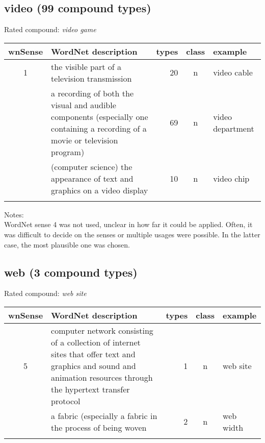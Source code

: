 \subsection{video       (99 compound types)}
Rated compound: \emph{video game}


\vspace*{1ex}

\noindent
\begin{longtable}{c>{\raggedright\arraybackslash}p{5cm}rc>{\raggedright\arraybackslash}p{2cm}}\lsptoprule
{\small wnSense}&WordNet description&types&class&example\\\midrule
1&the visible part of a television transmission&20&n&video cable\\\tablevspace
2&a recording of both the visual and audible components (especially one containing a recording of a movie or television program)&69&n&video department\\\tablevspace
3&(computer science) the appearance of text and graphics on a video display&10&n&video chip\\\lspbottomrule
\end{longtable}

\noindent
Notes:\\ 
WordNet sense 4 was not used, unclear in how far it could be
applied. Often, it was difficult to decide on the senses or multiple
usages were possible. In the latter case, the most plausible one was chosen.

\subsection{web          (3 compound types)}
Rated compound: \emph{web site}

\vspace*{1ex}

\noindent
\begin{longtable}{c>{\raggedright\arraybackslash}p{5cm}rc>{\raggedright\arraybackslash}p{2cm}}\lsptoprule
{\small wnSense}&WordNet description&types&class&example\\\midrule
5&computer network consisting of a collection of internet sites that offer text and graphics and sound and animation resources through the hypertext transfer protocol&1&n&web site\\\tablevspace
6&a fabric (especially a fabric in the process of being woven&2&n&web width\\\lspbottomrule
\end{longtable}

